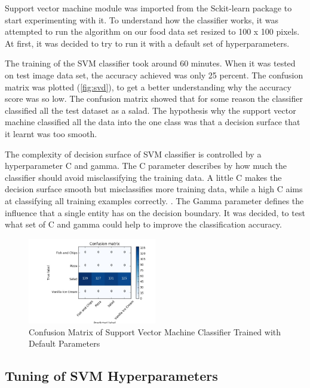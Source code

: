 Support vector machine module was imported from the Sckit-learn package to start experimenting with it. To understand how the classifier works, it was attempted to run the algorithm on our food data set resized to 100 x 100 pixels. At first, it was decided to try to run it with a default set of hyperparameters.

The training of the SVM classifier took around 60 minutes. When it was tested on test image data set, the accuracy achieved was only 25 percent. The confusion matrix was plotted (\autoref{fig:svd}),  to get a better understanding why the accuracy score was so low. The confusion matrix showed that for some reason the classifier classified all the test dataset as a salad. The hypothesis why the support vector machine classified all the data into the one class was that a decision surface that it learnt was too smooth.

The complexity of decision surface of SVM classifier is controlled by a  hyperparameter C and gamma. The C parameter describes by how much the classifier should avoid misclassifying the training data. A little C makes the decision surface smooth but misclassifies more training data, while a high C aims at classifying all training examples correctly. \citep{hyper}. The Gamma parameter defines the influence that a single entity has on the decision boundary.  It was decided, to test what set of C and gamma could help to improve the classification accuracy.



\begin{figure}[h]
\centering
\includegraphics[width=0.5\textwidth]{Figures/svm_default.jpg}
\caption{Confusion Matrix of Support Vector Machine Classifier Trained with Default Parameters}
\label{fig:svd}
\end{figure}


\subsection{Tuning of SVM Hyperparameters}

